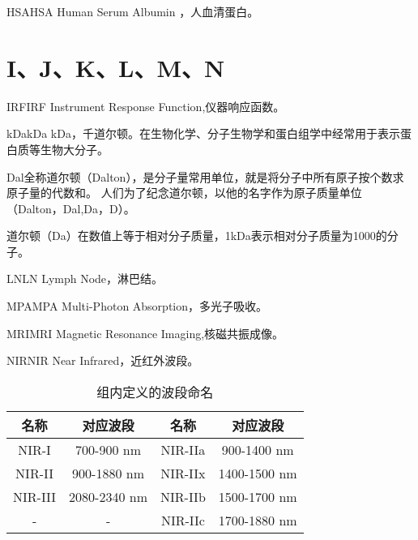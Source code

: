 \documentclass[cn,11pt,chinese]{elegantbook}
\begin{document}
  
  \begin{theorem}{HSA}{HSA} 
  	Human Serum Albumin ，人血清蛋白。
    \end{theorem}
  

\section{I、J、K、L、M、N}

\begin{theorem}{IRF}{IRF} 
  Instrument Response Function,仪器响应函数。
\end{theorem}

\begin{theorem}{kDa}{kDa} 
  kDa，千道尔顿。在生物化学、分子生物学和蛋白组学中经常用于表示蛋白质等生物大分子。

Dal全称道尔顿（Dalton），是分子量常用单位，就是将分子中所有原子按个数求原子量的代数和。
人们为了纪念道尔顿，以他的名字作为原子质量单位（Dalton，Dal,Da，D）。

道尔顿（Da）在数值上等于相对分子质量，1kDa表示相对分子质量为1000的分子。
\end{theorem}

\begin{theorem}{LN}{LN} 
  Lymph Node，淋巴结。
   \end{theorem}

\begin{theorem}{MPA}{MPA} 
Multi-Photon Absorption，多光子吸收。
 \end{theorem}

 \begin{theorem}{MRI}{MRI} 
  Magnetic Resonance Imaging,核磁共振成像。
   \end{theorem}

\begin{theorem}{NIR}{NIR} 
 Near Infrared，近红外波段。
\end{theorem}

\begin{table}[!htb]
  \centering
  \caption{组内定义的波段命名}
    \begin{tabular}{cc||cc}
    \hline
    \textbf{名称} & \textbf{对应波段} & \textbf{名称} & \textbf{对应波段}  \\
    \hline
    NIR-I  & 700-900 nm & NIR-IIa & 900-1400 nm     \\  
    NIR-II  & 900-1880 nm & NIR-IIx & 1400-1500 nm     \\  
    NIR-III  & 2080-2340 nm & NIR-IIb & 1500-1700 nm     \\  
    -  & - & NIR-IIc & 1700-1880 nm     \\  
    \hline
    \end{tabular}%
  \label{tab:NIR}%
\end{table}%
\end{document}
